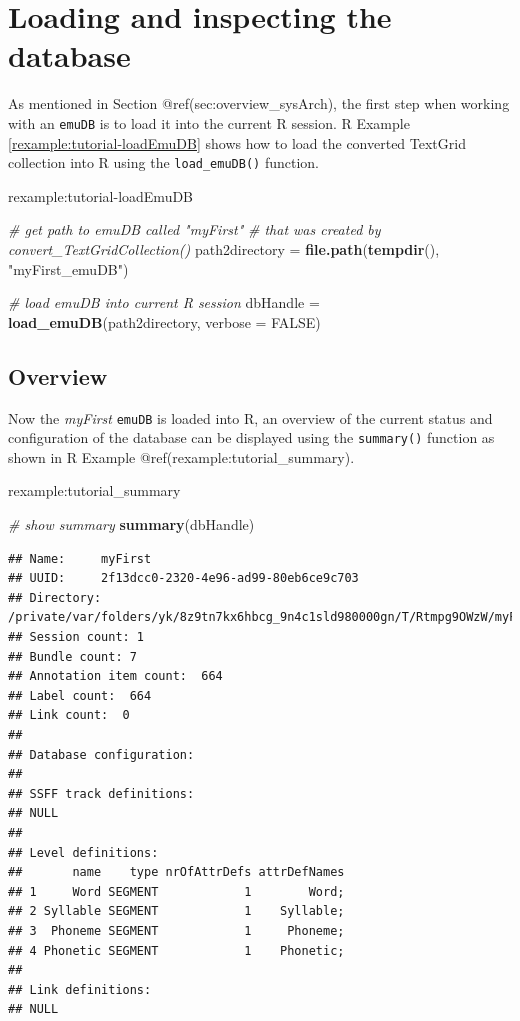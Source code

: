 \documentclass[]{book}
\newenvironment{Shaded}{\begin{snugshade}}{\end{snugshade}}
\newcommand{\CommentTok}[1]{\textcolor[rgb]{0.56,0.35,0.01}{\textit{#1}}}
\newcommand{\DataTypeTok}[1]{\textcolor[rgb]{0.13,0.29,0.53}{#1}}
\newcommand{\KeywordTok}[1]{\textcolor[rgb]{0.13,0.29,0.53}{\textbf{#1}}}
\newcommand{\NormalTok}[1]{#1}
\newcommand{\OtherTok}[1]{\textcolor[rgb]{0.56,0.35,0.01}{#1}}
\newcommand{\StringTok}[1]{\textcolor[rgb]{0.31,0.60,0.02}{#1}}
\theoremstyle{definition}
\theoremstyle{definition}
\theoremstyle{definition}
\theoremstyle{remark}
\begin{document}
\hypertarget{loading-and-inspecting-the-database}{%
\section{Loading and inspecting the
database}\label{loading-and-inspecting-the-database}}

As mentioned in Section @ref(sec:overview\_sysArch), the first step when
working with an \texttt{emuDB} is to load it into the current R session.
R Example \ref{rexample:tutorial-loadEmuDB} shows how to load the
converted TextGrid collection into R using the \texttt{load\_emuDB()}
function.

rexample:tutorial-loadEmuDB

\begin{Shaded}
\begin{Highlighting}[]
\CommentTok{# get path to emuDB called "myFirst"}
\CommentTok{# that was created by convert_TextGridCollection()}
\NormalTok{path2directory =}\StringTok{ }\KeywordTok{file.path}\NormalTok{(}\KeywordTok{tempdir}\NormalTok{(), }\StringTok{"myFirst_emuDB"}\NormalTok{)}

\CommentTok{# load emuDB into current R session}
\NormalTok{dbHandle =}\StringTok{ }\KeywordTok{load_emuDB}\NormalTok{(path2directory, }\DataTypeTok{verbose =} \OtherTok{FALSE}\NormalTok{)}
\end{Highlighting}
\end{Shaded}

\hypertarget{overview}{%
\subsection{Overview}\label{overview}}

Now the \emph{myFirst} \texttt{emuDB} is loaded into R, an overview of
the current status and configuration of the database can be displayed
using the \texttt{summary()} function as shown in R Example
@ref(rexample:tutorial\_summary).

rexample:tutorial\_summary

\begin{Shaded}
\begin{Highlighting}[]
\CommentTok{# show summary}
\KeywordTok{summary}\NormalTok{(dbHandle)}
\end{Highlighting}
\end{Shaded}

\begin{verbatim}
## Name:     myFirst 
## UUID:     2f13dcc0-2320-4e96-ad99-80eb6ce9c703 
## Directory:    /private/var/folders/yk/8z9tn7kx6hbcg_9n4c1sld980000gn/T/Rtmpg9OWzW/myFirst_emuDB 
## Session count: 1 
## Bundle count: 7 
## Annotation item count:  664 
## Label count:  664 
## Link count:  0 
## 
## Database configuration:
## 
## SSFF track definitions:
## NULL
## 
## Level definitions:
##       name    type nrOfAttrDefs attrDefNames
## 1     Word SEGMENT            1        Word;
## 2 Syllable SEGMENT            1    Syllable;
## 3  Phoneme SEGMENT            1     Phoneme;
## 4 Phonetic SEGMENT            1    Phonetic;
## 
## Link definitions:
## NULL
\end{verbatim}
\end{document}
